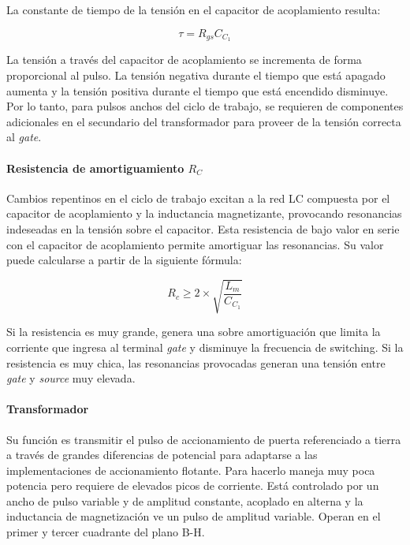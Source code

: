 La constante de tiempo de la tensión en el capacitor de acoplamiento resulta:

$$ \tau=R_{gs}C_{C_1} $$

La tensión a través del capacitor de acoplamiento se incrementa de forma proporcional al pulso. 
La tensión negativa durante el tiempo que está apagado aumenta y la tensión positiva durante el tiempo que está encendido disminuye. 
Por lo tanto, para pulsos anchos del ciclo de trabajo, se requieren de componentes adicionales 
en el secundario del transformador para proveer de la tensión correcta al \textit{gate}. 


\paragraph{Resistencia de amortiguamiento $R_C$}

Cambios repentinos en el ciclo de trabajo excitan a la red LC compuesta por el capacitor de acoplamiento 
y la inductancia magnetizante, provocando resonancias indeseadas en la tensión sobre el capacitor. 
Esta resistencia de bajo valor en serie con el capacitor de acoplamiento permite amortiguar las resonancias. 
Su valor puede calcularse a partir de la siguiente fórmula:

$$ R_c\geq2\times\sqrt{\frac{L_m}{C_{C_1}}} $$

Si la resistencia es muy grande, genera una sobre amortiguación que limita la corriente que ingresa al terminal \textit{gate} y disminuye la frecuencia de switching. 
Si la resistencia es muy chica, las resonancias provocadas generan una tensión entre \textit{gate} y \textit{source} muy elevada.

\paragraph{Transformador}

Su función es transmitir el pulso de accionamiento de puerta referenciado a tierra a través de grandes diferencias de potencial para adaptarse a las implementaciones de accionamiento flotante. 
Para hacerlo maneja muy poca potencia pero requiere de elevados picos de corriente. 
Está controlado por un ancho de pulso variable y de amplitud constante,
acoplado en alterna y la inductancia de magnetización ve un pulso de amplitud variable.
Operan en el primer y tercer cuadrante del plano B-H.

